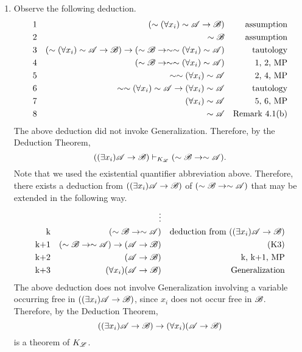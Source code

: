 \begin{enumerate}
\begin{enumerate}
      \item Observe the following deduction.
        \begin{align*}
          \text{1}&&
          (\sim(\forall x_i)\sim\mathscr{A} \rightarrow \mathscr{B})&&
          \text{assumption}\\
          \text{2}&&
          \sim\mathscr{B}&&
          \text{assumption}\\
          \text{3}&&
          (\sim(\forall x_i)\sim\mathscr{A} \rightarrow \mathscr{B}) \rightarrow (\sim\mathscr{B} \rightarrow \sim\sim(\forall x_i)\sim\mathscr{A})&&
          \text{tautology}\\
          \text{4}&&
          (\sim\mathscr{B} \rightarrow \sim\sim(\forall x_i)\sim\mathscr{A})&&
          \text{1, 2, MP}\\
          \text{5}&&
          \sim\sim(\forall x_i)\sim\mathscr{A}&&
          \text{2, 4, MP}\\
          \text{6}&&
          \sim\sim(\forall x_i)\sim\mathscr{A} \rightarrow (\forall x_i)\sim\mathscr{A}&&
          \text{tautology}\\
          \text{7}&&
          (\forall x_i)\sim\mathscr{A}&&
          \text{5, 6, MP}\\
          \text{8}&&
          \sim\mathscr{A}&&
          \text{Remark 4.1(b)}
        \end{align*}
        The above deduction did not invoke Generalization. Therefore, by the Deduction Theorem,
        \[((\exists x_i)\mathscr{A} \rightarrow \mathscr{B}) \vdash_{K_{\mathscr{L}}} (\sim\mathscr{B} \rightarrow \sim\mathscr{A}).\]
        Note that we used the existential quantifier abbreviation above. Therefore, there exists a deduction from \(((\exists x_i)\mathscr{A} \rightarrow \mathscr{B})\) of \((\sim\mathscr{B} \rightarrow \sim\mathscr{A})\) that may be extended in the following way.
        \begin{align*}
          &&
          \vdots&&
          \\
          \text{k}&&
          (\sim\mathscr{B} \rightarrow \sim\mathscr{A})&&
          \text{deduction from \(((\exists x_i)\ensuremath\mathscr{A}\ensuremath\rightarrow\ensuremath\mathscr{B})\)}\\
          \text{k+1}&&
          (\sim\mathscr{B} \rightarrow \sim\mathscr{A}) \rightarrow (\mathscr{A} \rightarrow \mathscr{B})&&
          \text{(K3)}\\
          \text{k+2}&&
          (\mathscr{A} \rightarrow \mathscr{B})&&
          \text{k, k+1, MP}\\
          \text{k+3}&&
          (\forall x_i)(\mathscr{A} \rightarrow \mathscr{B})&&
          \text{Generalization}
        \end{align*}
        The above deduction does not involve Generalization involving a variable occurring free in \(((\exists x_i)\mathscr{A} \rightarrow \mathscr{B})\), since \(x_i\) does not occur free in \(\mathscr{B}\). Therefore, by the Deduction Theorem,
        \[((\exists x_i)\mathscr{A} \rightarrow \mathscr{B}) \rightarrow (\forall x_i)(\mathscr{A} \rightarrow \mathscr{B})\]
        is a theorem of \(K_{\mathscr{L}}\).


\end{enumerate}
\end{enumerate}
